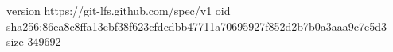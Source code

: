 version https://git-lfs.github.com/spec/v1
oid sha256:86ea8c8ffa13ebf38f623cfdcdbb47711a70695927f852d2b7b0a3aaa9c7e5d3
size 349692
